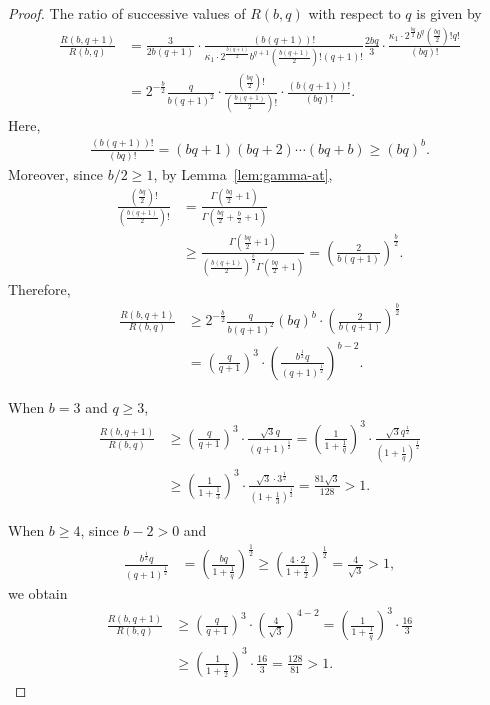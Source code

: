 \documentclass[12pt,reqno]{amsart}
\newcommand{\f}[2]{\frac{#1}{#2}}							%
\theoremstyle{mythmstyle}
\theoremstyle{mydefstyle}
\newcommand{\lemref}[1]{Lemma~\ref{#1}}
\numberwithin{equation}{section}
\begin{document}
\begin{proof}
The ratio of successive values of $R(b, q)$ with respect to $q$ is given by
\begin{align}
\f{R(b, q+1)}{R(b, q)} &= \f{3}{2b(q+1)}\cdot\f{(b(q+1))!}{\kappa_{1}\cdot 2^{\f{b(q+1)}{2}}b^{q+1}\left(\f{b(q+1)}{2}\right)!(q+1)!}
\f{2bq}{3}\cdot\f{\kappa_{1}\cdot 2^{\f{bq}{2}}b^{q}\left(\f{bq}{2}\right)!q!}{(bq)!} \\
&= 2^{-\f{b}{2}}\f{q}{b(q+1)^{2}}\cdot\f{\left(\f{bq}{2}\right)!}{\left(\f{b(q+1)}{2}\right)!}\cdot\f{(b(q+1))!}{(bq)!}.
\end{align}
Here,
\begin{align}
\f{(b(q+1))!}{(bq)!} = (bq+1)(bq+2)\cdots(bq+b) \ge (bq)^{b}. 
\end{align}
Moreover, since $b/2 \ge 1$, by \lemref{lem:gamma-at},
\begin{align}
\f{\left(\f{bq}{2}\right)!}{\left(\f{b(q+1)}{2}\right)!} &= \f{\Gamma\left(\f{bq}{2}+1\right)}{\Gamma\left(\f{bq}{2}+\f{b}{2}+1\right)} \\
&\ge \f{\Gamma\left(\f{bq}{2}+1\right)}{\left(\f{b(q+1)}{2}\right)^{\f{b}{2}}\Gamma\left(\f{bq}{2}+1\right)}
= \left(\f{2}{b(q+1)}\right)^{\f{b}{2}}.
\end{align}
Therefore,
\begin{align}
\f{R(b, q+1)}{R(b, q)} &\ge 2^{-\f{b}{2}}\f{q}{b(q+1)^{2}}(bq)^{b}\cdot\left(\f{2}{b(q+1)}\right)^{\f{b}{2}} \\
&= \left(\f{q}{q+1}\right)^{3}\cdot\left(\f{b^{\f{1}{2}}q}{(q+1)^{\f{1}{2}}}\right)^{b-2}.
\end{align}

When $b = 3$ and $q \ge 3$,
\begin{align}
\f{R(b, q+1)}{R(b, q)} &\ge \left(\f{q}{q+1}\right)^{3}\cdot\f{\sqrt{3}q}{(q+1)^{\f{1}{2}}}
= \left(\f{1}{1+\f{1}{q}}\right)^{3}\cdot\f{\sqrt{3}q^{\f{1}{2}}}{\left(1+\f{1}{q}\right)^{\f{1}{2}}} \\
&\ge \left(\f{1}{1+\f{1}{3}}\right)^{3}\cdot\f{\sqrt{3}\cdot 3^{\f{1}{2}}}{\left(1+\f{1}{3}\right)^{\f{1}{2}}} = \f{81\sqrt{3}}{128} > 1.
\end{align}

When $b \ge 4$, since $b-2 > 0$ and
\begin{align}
\f{b^{\f{1}{2}}q}{(q+1)^{\f{1}{2}}} &= \left(\f{bq}{1+\f{1}{q}}\right)^{\f{1}{2}} \ge \left(\f{4\cdot 2}{1+\f{1}{2}}\right)^{\f{1}{2}}
= \f{4}{\sqrt{3}} > 1,
\end{align}
we obtain
\begin{align}
\f{R(b, q+1)}{R(b, q)} &\ge \left(\f{q}{q+1}\right)^{3}\cdot\left(\f{4}{\sqrt{3}}\right)^{4-2}
= \left(\f{1}{1+\f{1}{q}}\right)^{3}\cdot\f{16}{3} \\
&\ge \left(\f{1}{1+\f{1}{2}}\right)^{3}\cdot\f{16}{3} = \f{128}{81} > 1.
\end{align}


\end{proof}
\end{document}
